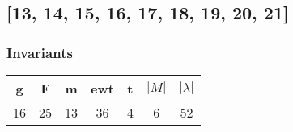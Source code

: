 \documentclass[a4paper]{article}
\begin{document}
\newpage\subsection{[13, 14, 15, 16, 17, 18, 19, 20, 21]}
\noindent\begin{minipage}{0.6\textwidth}
\subsubsection*{Invariants}
\centering
\begin{tabular}{|c|c|c|c|c|c|c|}
\toprule
g & F & m & ewt & t & \(|M|\) & \(|\lambda|\) \\
\midrule
16 & 25 & 13 & 36 & 4 & 6 & 52 \\
\bottomrule
\end{tabular}
\end{minipage}%
\end{document}
